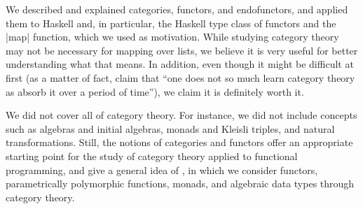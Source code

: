 \documentclass[11pt,letterpaper]{article}
\theoremstyle{definition}
\begin{document}
We described and explained categories, functors, and endofunctors, and
applied them to Haskell and, in particular, the Haskell type class of
functors and the |map| function, which we used as motivation. While
studying category theory may not be necessary for mapping over lists,
we believe it is very useful for better understanding what that means.
In addition, even though it might be difficult at first (as a matter
of fact, \textcite[25]{bird-demoor-1997} claim that ``one does not so
much learn category theory as absorb it over a period of time''), we
claim it is definitely worth it.

We did not cover all of category theory. For instance, we did not
include concepts such as algebras and initial algebras, monads and
Kleisli triples, and natural transformations. Still, the notions of
categories and functors offer an appropriate starting point for the
study of category theory applied to functional programming, and give a
general idea of \parencite{villaisaza-2014}, in which we consider
functors, parametrically polymorphic functions, monads, and algebraic
data types through category theory.


\printbibliography

\end{document}
